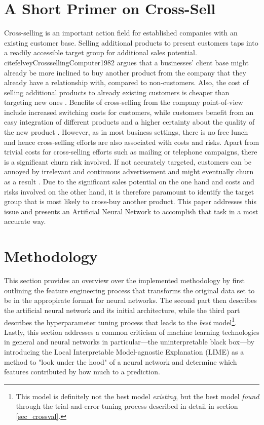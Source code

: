 \documentclass[12pt,a4paper]{article}
\begin{document}
\section{A Short Primer on Cross-Sell}
Cross-selling is an important action field for established companies with an existing customer base.
Selling additional products to present customers taps into a readily accessible target group for additional sales potential.
cite{felveyCrosssellingComputer1982} argues that a businesses' client base might already be more inclined to buy another product from the company that they already have a relationship with, compared to non-customers.
Also, the cost of selling additional products to already existing customers is cheaper than targeting new ones \citep{reichheldZeroDefectionsQuality1990}.
Benefits of cross-selling from the company point-of-view include increased switching costs for customers, while customers benefit from an easy integration
of different products and a higher certainty about the quality of the new product \citep{kamakuraApplyingLatentTrait1991, kamakuraCrosssellingDatabaseMarketing2003}. 
However, as in most business settings, there is no free lunch and hence cross-selling efforts are also associated with costs and risks.
Apart from trivial costs for cross-selling efforts such as mailing or telephone campaigns, there is a significant churn risk involved.
If not accurately targeted, customers can be annoyed by irrelevant and continuous advertisement and might eventually churn as a result \citep{keaveneyCustomerSwitchingBehavior1995}.
Due to the significant sales potential on the one hand and costs and risks involved on the other hand, it is therefore paramount to identify the target group that is most likely to cross-buy another product.
This paper addresses this issue and presents an Artificial Neural Network to accomplish that task in a most accurate way.


\section{Methodology}
This section provides an overview over the implemented methodology by first outlining the feature engineering process that transforms the original data set
to be in the appropirate format for neural networks.
The second part then describes the artificial neural network and its initial architecture, while the third part describes the hyperparameter tuning process
that leads to the \textit{best} model\footnote{This model is definitely not the best model \textit{existing}, but the best model \textit{found} through the trial-and-error tuning process described in detail in section \ref{sec_crossval}.}.
Lastly, this section addresses a common criticism of machine learning technologies in general and neural networks in particular---the 
uninterpretable black box---by introducing the Local Interpretable Model-agnostic Explanation (LIME) as a method to 
"look under the hood" of a neural network and determine which features contributed by how much to a prediction.
\end{document}
